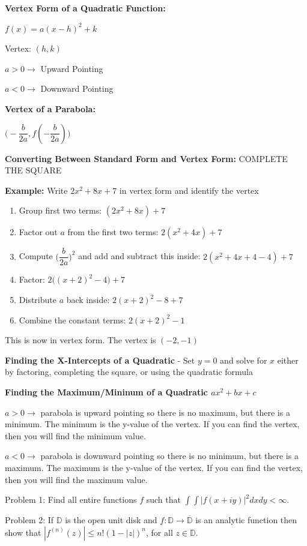 \documentclass[12pt]{article}
\begin{document}
\textbf{Vertex Form of a Quadratic Function:}
\newline

\centerline{$f(x) = a(x-h)^{2} + k$}

\hspace{6.5cm} Vertex: $(h,k)$

\hspace{6.5cm} $a > 0 \to$ Upward Pointing

\hspace{6.5cm} $a < 0 \to$ Downward Pointing

\textbf{Vertex of a Parabola:}
\newline

\centerline{$\Big(-\dfrac{b}{2a}, f(-\dfrac{b}{2a}) \Big)$}

\vspace{1cm}

\textbf{Converting Between Standard Form and Vertex Form:} COMPLETE THE SQUARE

\textbf{Example:} Write $2x^2 + 8x + 7$ in vertex form and identify the vertex

\begin{enumerate}

\item Group first two terms: $(2x^2 + 8x) + 7$
\item Factor out $a$ from the first two terms: $2(x^2 + 4x) + 7$
\item Compute $\Big(\dfrac{b}{2a}\Big)^2$ and add and subtract this inside: $2(x^2 + 4x + 4  - 4) + 7$
\item Factor: $2\Big((x+2)^2 - 4\Big) + 7$
\item Distribute $a$ back inside: $2(x+2)^2 - 8 + 7$
\item Combine the constant terms: $2(x+2)^2 - 1$

\end{enumerate}

This is now in vertex form. The vertex is $(-2,-1)$

\textbf{Finding the X-Intercepts of a Quadratic} - Set $y = 0$ and solve for $x$ either by factoring, completing the square, or using the quadratic formula

\textbf{Finding the Maximum/Mininum of a Quadratic $ax^2 + bx + c$}

$a > 0 \to $ parabola is upward pointing so there is no maximum, but there is a minimum. The minimum is the y-value of the vertex. If you can find the vertex, then you will find the minimum value.

$a < 0 \to $ parabola is downward pointing so there is no minimum, but there is a maximum. The maximum is the y-value of the vertex. If you can find the vertex, then you will find the maximum value.

Problem 1: Find all entire functions $f$ such that $\int\int |f(x+iy)|^2dxdy<\infty$.

Problem 2: If $\mathbb{D}$ is the open unit disk and $f: \mathbb{D} \to  \overline{\mathbb{D}}$ is an analytic function then show that $|f^{(n)}(z)|\leq n!(1-|z|)^n$, for all $z\in \mathbb D$.
\end{document}
